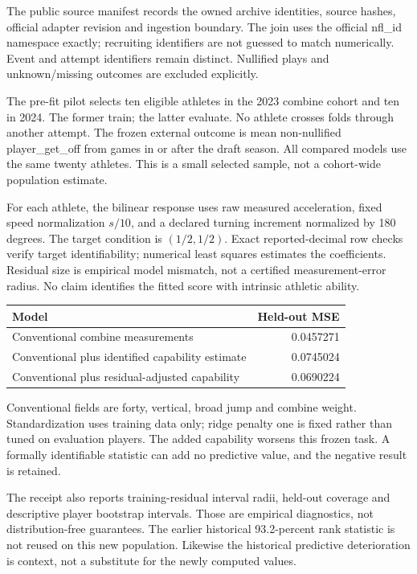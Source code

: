 \documentclass[
  11pt,
  a4paper,
]{report}
\begin{document}
The public source manifest records the owned archive identities, source
hashes, official adapter revision and ingestion boundary. The join uses
the official nfl\_id namespace exactly; recruiting identifiers are not
guessed to match numerically. Event and attempt identifiers remain
distinct. Nullified plays and unknown/missing outcomes are excluded
explicitly.

The pre-fit pilot selects ten eligible athletes in the 2023 combine
cohort and ten in 2024. The former train; the latter evaluate. No
athlete crosses folds through another attempt. The frozen external
outcome is mean non-nullified player\_get\_off from games in or after
the draft season. All compared models use the same twenty athletes. This
is a small selected sample, not a cohort-wide population estimate.

For each athlete, the bilinear response uses raw measured acceleration,
fixed speed normalization \(s/10\), and a declared turning increment
normalized by 180 degrees. The target condition is \((1/2,1/2)\). Exact
reported-decimal row checks verify target identifiability; numerical
least squares estimates the coefficients. Residual size is empirical
model mismatch, not a certified measurement-error radius. No claim
identifies the fitted score with intrinsic athletic ability.

\begin{longtable}[]{@{}lr@{}}
\toprule\noalign{}
Model & Held-out MSE \\
\midrule\noalign{}
\endhead
\bottomrule\noalign{}
\endlastfoot
Conventional combine measurements & 0.0457271 \\
Conventional plus identified capability estimate & 0.0745024 \\
Conventional plus residual-adjusted capability & 0.0690224 \\
\end{longtable}

Conventional fields are forty, vertical, broad jump and combine weight.
Standardization uses training data only; ridge penalty one is fixed
rather than tuned on evaluation players. The added capability worsens
this frozen task. A formally identifiable statistic can add no
predictive value, and the negative result is retained.

The receipt also reports training-residual interval radii, held-out
coverage and descriptive player bootstrap intervals. Those are empirical
diagnostics, not distribution-free guarantees. The earlier historical
93.2-percent rank statistic is not reused on this new population.
Likewise the historical predictive deterioration is context, not a
substitute for the newly computed values.
\end{document}
